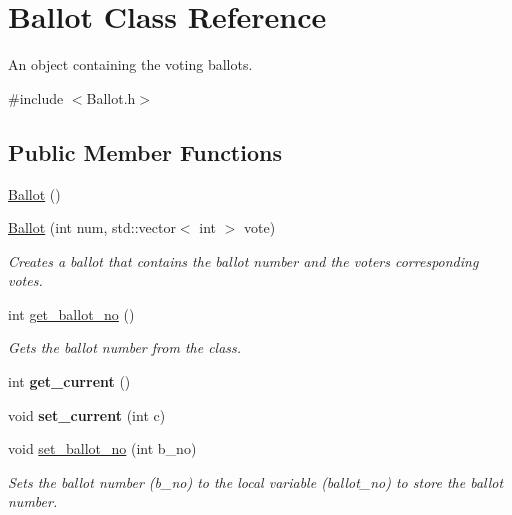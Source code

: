 \hypertarget{class_ballot}{}\section{Ballot Class Reference}
\label{class_ballot}


An object containing the voting ballots.  




{\ttfamily \#include $<$Ballot.\+h$>$}

\subsection*{Public Member Functions}
\begin{DoxyCompactItemize}
\item 
\mbox{\hyperlink{class_ballot_af9078126260b3f58ea91f6b82797396b}{Ballot}} ()
\item 
\mbox{\hyperlink{class_ballot_afdbfa652a622a1d5aad8ec911a29a91f}{Ballot}} (int num, std\+::vector$<$ int $>$ vote)
\begin{DoxyCompactList}\small\item\em Creates a ballot that contains the ballot number and the voters corresponding votes. \end{DoxyCompactList}\item 
\mbox{\label{class_ballot_ae68cc4486852163b21b85d0b96916a5e}} 
int \mbox{\hyperlink{class_ballot_ae68cc4486852163b21b85d0b96916a5e}{get\+\_\+ballot\+\_\+no}} ()
\begin{DoxyCompactList}\small\item\em Gets the ballot number from the class. \end{DoxyCompactList}\item 
\mbox{\label{class_ballot_a0a0775b462086988e8fc43b2afa27493}} 
int {\bfseries get\+\_\+current} ()
\item 
\mbox{\label{class_ballot_afbd626a534165145a4e60cc9519d3123}} 
void {\bfseries set\+\_\+current} (int c)
\item 
void \mbox{\hyperlink{class_ballot_a72f501296fc05e981791b5b380cc5152}{set\+\_\+ballot\+\_\+no}} (int b\+\_\+no)
\begin{DoxyCompactList}\small\item\em Sets the ballot number (b\+\_\+no) to the local variable (ballot\+\_\+no) to store the ballot number. \end{DoxyCompactList}\item 

\end{DoxyCompactItemize}
